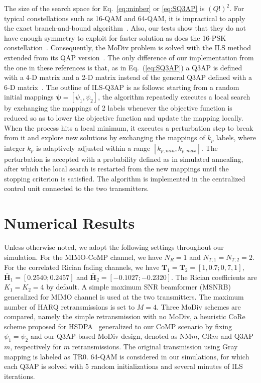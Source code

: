 \documentclass[journal]{IEEEtran}
\begin{document}
The size of the search space for Eq.~\eqref{eq:minber} or \eqref{eq:SQ3AP} is
$(Q!)^2$.
For typical constellations such as 16-QAM and
64-QAM, it is impractical to apply the exact branch-and-bound algorithm~\cite{hahn2008quadratic}. Also, our tests show that they do not have
enough symmetry to exploit for faster solution as does the 16-PSK
constellation~\cite{mittelmann2015solving}.
Consequently, the MoDiv problem is solved with the ILS
method~\cite[Sec. 5.5]{hahn2008quadratic} extended from its QAP
version~\cite{stutzle2006iterated}. The only difference of our
implementation from the one in these references is that, as in
Eq.~(\ref{eq:SQ3AP}) a Q3AP is defined with a 4-D matrix and a 2-D matrix
instead of the general Q3AP defined with a 6-D
matrix~\cite[Eq.(2)]{hahn2008quadratic}. The outline of ILS-Q3AP is as
follows: starting from a random initial mappings $\bm{\psi}=[\psi_1,
\psi_2]$, the algorithm repeatedly executes a local search by exchanging the
mappings of 2 labels whenever the objective function is reduced so as to lower
the objective function and update the mapping locally. When the process hits a
local minimum, it executes a perturbation step to break from it and explore new
solutions by exchanging the mappings of $k_p$ labels, where integer $k_p$ is
adaptively adjusted within a range $[k_{p,min}, k_{p,max}]$. The perturbation is
accepted with a probability defined as in simulated annealing, after which the
local search is restarted from the new mappings until the stopping criterion is
satisfied. The algorithm is implemented in the centralized control
unit connected to the two transmitters.

\section{Numerical Results}
\label{sec:numerical}
Unless otherwise noted, we adopt the following
settings throughout our simulation. For the MIMO-CoMP channel, we have $N_R=1$
and $N_{T, 1} = N_{T, 2} = 2$. For the correlated Rician fading channels, we
have $\mathbf{T}_1 =
\mathbf{T}_2 =[1,0.7;0,7,1]$, $\bar{\mathbf{H}}_{1} = [0.2540;
0.2457]$ and $\bar{\mathbf{H}}_{2} = [-0.1027; -0.2320]$.
The Rician coefficients are $K_1 = K_2 = 4$ by default. A simple maximum SNR
beamformer (MSNRB)~\cite{barriac2006space} generalized for MIMO channel is used at the two transmitters. 
The maximum number of HARQ retransmissions is set
to $M=4$. Three MoDiv schemes are compared, namely the simple retransmission with
no MoDiv, a heuristic CoRe scheme proposed for
HSDPA~\cite{panasonic2001enhanced} generalized to our CoMP scenario by fixing
$\psi_1 = \psi_2$ and our Q3AP-based MoDiv design, denoted
as NM$m$, CR$m$ and Q3AP$m$, respectively for $m$ retransmissions. The original
transmission using Gray mapping is labeled as TR0. 64-QAM is considered in our
simulations, for which each Q3AP is solved with 5 random initializations and
several minutes of ILS iterations.
\end{document}
